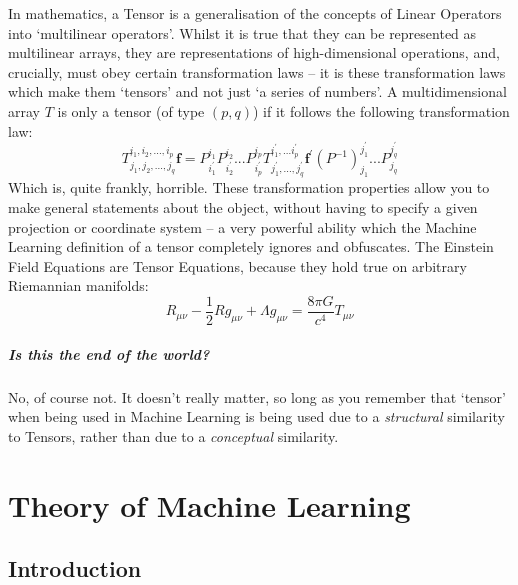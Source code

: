 \documentclass[a4paper,openany,11pt]{book}
\renewcommand\vec[1]{\boldsymbol{\mathbf{#1}}}
\begin{document}
			In mathematics, a Tensor is a generalisation of the concepts of Linear Operators into `multilinear operators'. Whilst it is true that they can be represented as multilinear arrays, they are representations of high-dimensional operations, and, crucially, must obey certain transformation laws -- it is these transformation laws which make them `tensors' and not just `a series of numbers'. A multidimensional array $T$ is only a tensor (of type $(p,q)$) if it follows the following transformation law:
			\begin{equation}
				T^{i_1,i_2,...,i_p}_{j_1,j_2,...,j_q} \vec{f} = P^{i_1}_{i^\prime_1} P^{i_2}_{i^\prime_2}...P^{i_p}_{i^\prime_p} T^{i^\prime_1,...i^\prime_p}_{j^\prime_1,...,j^\prime_q} \vec{f}^\prime (P^{-1})^{j^\prime_1}_{j_1} ...P^{j^\prime_q}_{j_q}
			\end{equation}
			Which is, quite frankly, horrible. These transformation properties allow you to make general statements about the object, without having to specify a given projection or coordinate system -- a very powerful ability which the Machine Learning definition of a tensor completely ignores and obfuscates. The Einstein Field Equations are Tensor Equations, because they hold true on arbitrary Riemannian manifolds:
			\begin{equation}
				R_{\mu\nu} - \frac{1}{2} R g_{\mu\nu} + \Lambda g_{\mu\nu} = \frac{8 \pi G}{c^4} T_{\mu \nu}
			\end{equation}



			\subsubsection{Is this the end of the world?}

			No, of course not. It doesn't really matter, so long as you remember that `tensor' when being used in Machine Learning is being used due to a \textit{structural} similarity to Tensors, rather than due to a \textit{conceptual} similarity.

	\part{Theory of Machine Learning}

		\chapter*{Introduction}

\end{document}
